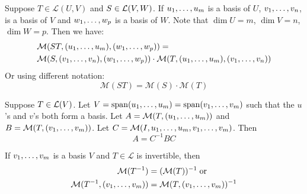   \begin{thm} 
    Suppose $T\in \mathcal{L}(U,V)$ and $S\in {\mathcal{L}(V,W)}$. If $u_1, \dots, u_m$ is a basis of $U$, $v_1, \dots, v_n$, is a basis of $V$ and $w_1, \dots, w_{p}$ is a basis of $W$. Note that $\dim U = m$, $\dim V = n$, $\dim W = p$. Then we have:
    \begin{equation}
    \begin{aligned}
      &\mathcal{M}(ST, (u_1, \dots, u_m), (w_1, \dots, w_{p})) = \\
      &\mathcal{M}(S, (v_1, \dots, v_n), (w_1, \dots, w_{p} ))
      \cdot
      \mathcal{M}(T, (u_1, \dots, u_m), (v_1, \dots, v_n   ))
    \end{aligned}
    \end{equation}
    Or using different notation:
    \begin{equation}
      \mathcal{M}(ST) = \mathcal{M}(S) \cdot \mathcal{M}(T)
    \end{equation}
  \end{thm}

  \setcounter{thm}{83}
  \begin{thm}
    Suppose $T \in \mathcal{L}(V)$. Let
    $V = \operatorname{span} (u_1, \dots, u_m) = \operatorname{span} (v_1, \dots, v_m)$ such that the $u$'s and $v$'s both form a basis. Let $A=\mathcal{M}(T, (u_1, \dots, u_m))$ and $B=\mathcal{M}(T,(v_1, \dots, v_m))$. Let
    $C=\mathcal{M}(I, u_1, \dots, u_m, v_1, \dots, v_m)$. Then
    \begin{equation}
    A = C^{-1} B C
    \end{equation}
  \end{thm}

  \setcounter{thm}{85}
  \begin{thm}
    If $v_1, \dots, v_m$ is a basis $V$ and $T\in \mathcal{L}$ is invertible, then
    \begin{equation}
      \begin{aligned}
        \mathcal{M}(T^{-1}) & = (\mathcal{M}(T))^{-1} \; \text{or} \\
        \mathcal{M}(T^{-1}, (v_1, \dots, v_m)) & =\mathcal{M}(T, (v_1, \dots, v_m))^{-1}
      \end{aligned}
    \end{equation}
  \end{thm}